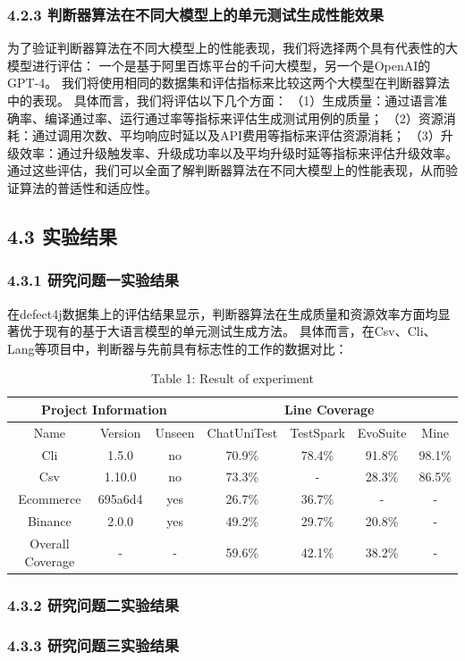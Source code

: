 \subsubsection{4.2.3 判断器算法在不同大模型上的单元测试生成性能效果}
为了验证判断器算法在不同大模型上的性能表现，我们将选择两个具有代表性的大模型进行评估：
一个是基于阿里百炼平台的千问大模型，另一个是OpenAI的GPT-4。
我们将使用相同的数据集和评估指标来比较这两个大模型在判断器算法中的表现。
具体而言，我们将评估以下几个方面：
（1）生成质量：通过语言准确率、编译通过率、运行通过率等指标来评估生成测试用例的质量；
（2）资源消耗：通过调用次数、平均响应时延以及API费用等指标来评估资源消耗；
（3）升级效率：通过升级触发率、升级成功率以及平均升级时延等指标来评估升级效率。
通过这些评估，我们可以全面了解判断器算法在不同大模型上的性能表现，从而验证算法的普适性和适应性。

\subsection{4.3 实验结果}
\subsubsection{4.3.1 研究问题一实验结果}
在defect4j数据集上的评估结果显示，判断器算法在生成质量和资源效率方面均显著优于现有的基于大语言模型的单元测试生成方法。
具体而言，在Csv、Cli、Lang等项目中，判断器与先前具有标志性的工作的数据对比：
\begin{table}[htbp]
    \centering
    \caption{Table 1: Result of experiment}
    \label{tab:result-of-experiment-1}
    \begin{tabular}{|c|c|c|c|c|c|c|}
        \hline
        \multicolumn{3}{|c|}{Project Information} & \multicolumn{4}{c|}{Line Coverage} \\ \hline
        Name & Version & Unseen & ChatUniTest & TestSpark & EvoSuite & Mine \\ \hline
        Cli & 1.5.0 & no & 70.9\% & 78.4\% & 91.8\% & 98.1\% \\ \hline
        Csv & 1.10.0 & no & 73.3\% & - & 28.3\% & 86.5\% \\ \hline
        Ecommerce & 695a6d4 & yes & 26.7\% & 36.7\% & - & - \\ \hline
        Binance & 2.0.0 & yes & 49.2\% & 29.7\% & 20.8\% & - \\ \hline
        Overall Coverage & - & - & 59.6\% & 42.1\% & 38.2\% & - \\ \hline
    \end{tabular}
\end{table}

\subsubsection{4.3.2 研究问题二实验结果}


\subsubsection{4.3.3 研究问题三实验结果}

